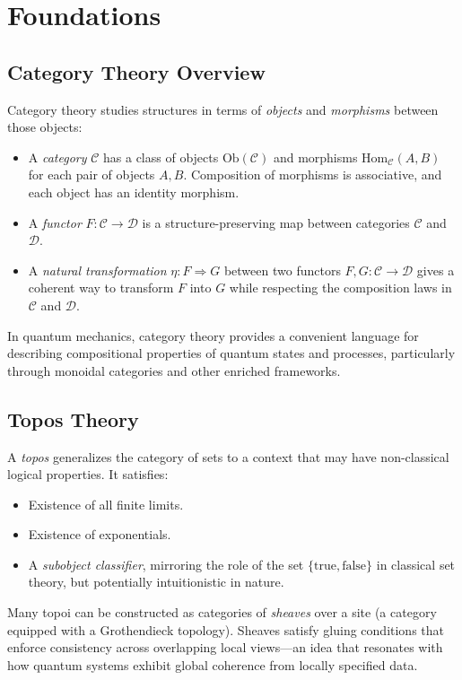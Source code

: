 \documentclass[11pt]{article}
\begin{document}
\section{Foundations}\label{sec:foundations}
\subsection{Category Theory Overview}
Category theory studies structures in terms of \emph{objects} and \emph{morphisms} between those objects:
\begin{itemize}
    \item A \emph{category} $\mathcal{C}$ has a class of objects $\mathrm{Ob}(\mathcal{C})$ and morphisms $\mathrm{Hom}_{\mathcal{C}}(A,B)$ for each pair of objects $A, B$. Composition of morphisms is associative, and each object has an identity morphism.
    \item A \emph{functor} $F : \mathcal{C} \to \mathcal{D}$ is a structure-preserving map between categories $\mathcal{C}$ and $\mathcal{D}$.
    \item A \emph{natural transformation} $\eta : F \Rightarrow G$ between two functors $F, G : \mathcal{C} \to \mathcal{D}$ gives a coherent way to transform $F$ into $G$ while respecting the composition laws in $\mathcal{C}$ and $\mathcal{D}$.
\end{itemize}
In quantum mechanics, category theory provides a convenient language for describing compositional properties of quantum states and processes, particularly through monoidal categories and other enriched frameworks.

\subsection{Topos Theory}
A \emph{topos} generalizes the category of sets to a context that may have non-classical logical properties. It satisfies:
\begin{itemize}
    \item Existence of all finite limits.
    \item Existence of exponentials.
    \item A \emph{subobject classifier}, mirroring the role of the set $\{\text{true}, \text{false}\}$ in classical set theory, but potentially intuitionistic in nature.
\end{itemize}
Many topoi can be constructed as categories of \emph{sheaves} over a site (a category equipped with a Grothendieck topology). Sheaves satisfy gluing conditions that enforce consistency across overlapping local views—an idea that resonates with how quantum systems exhibit global coherence from locally specified data.
\end{document}
